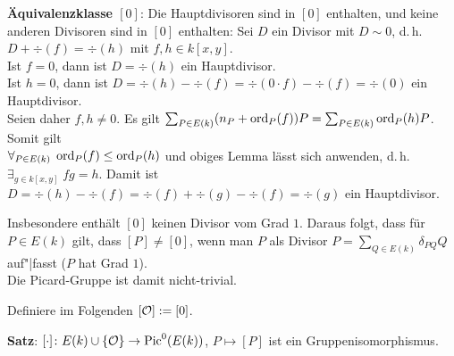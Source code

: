 \textbf{Äquivalenzklasse $[0]$}:
Die Hauptdivisoren sind in $[0]$ enthalten,
und keine anderen Divisoren sind in $[0]$ enthalten:
Sei $D$ ein Divisor mit $D \sim 0$, d.\,h. $D + \div(f) = \div(h)$ mit $f, h \in k[x, y]$.\\
Ist $f = 0$, dann ist $D = \div(h)$ ein Hauptdivisor.\\
Ist $h = 0$, dann ist $D = \div(h) - \div(f) = \div(0 \cdot f) - \div(f) = \div(0)$ ein
Hauptdivisor.\\
Seien daher $f, h \not= 0$.
Es gilt $\sum_{P \in E(k)} (n_P + \operatorname{ord}_P(f)) P = \sum_{P \in E(k)} \operatorname{ord}_P(h) P$.
Somit gilt\\
$\forall_{P \in E(k)}\; \operatorname{ord}_P(f) \le \operatorname{ord}_P(h)$ und obiges Lemma lässt sich
anwenden, d.\,h. $\exists_{g \in k[x, y]}\; fg = h$.
Damit ist $D = \div(h) - \div(f) = \div(f) + \div(g) - \div(f) = \div(g)$ ein Hauptdivisor.

Insbesondere enthält $[0]$ keinen Divisor vom Grad $1$.
Daraus folgt, dass für $P \in E(k)$ gilt, dass $[P] \not= [0]$,
wenn man $P$ als Divisor $P = \sum_{Q \in E(k)} \delta_{PQ} Q$ auf"|fasst ($P$ hat Grad $1$).\\
Die Picard-Gruppe ist damit nicht-trivial.

\linie

Definiere im Folgenden $[\mathcal{O}] := [0]$.

\textbf{Satz}:
$[\cdot]\colon E(k) \cup \{\mathcal{O}\} \to \operatorname{Pic}^0(E(k))$, $P \mapsto [P]$
ist ein Gruppenisomorphismus.

